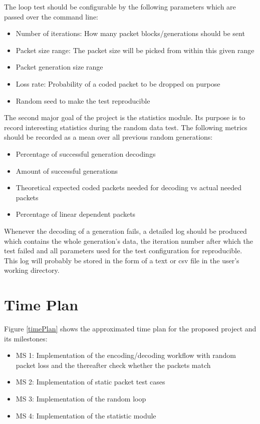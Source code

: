 \documentclass[a4paper,english,10pt]{tumarticle}
\begin{document}
The loop test should be configurable by the following parameters which are passed over the command line:
\begin{itemize}
    \setlength{\itemsep}{1pt}
	\setlength{\parskip}{0pt}
	\setlength{\parsep}{0pt}
    \item Number of iterations: How many packet blocks/generations should be sent
    \item Packet size range: The packet size will be picked from within this given range
    \item Packet generation size range
    \item Loss rate: Probability of a coded packet to be dropped on purpose
    \item Random seed to make the test reproducible
\end{itemize}

The second major goal of the project is the statistics module. Its purpose is to record interesting statistics during the random data test. The following metrics should be recorded as a mean over all previous random generations:
\begin{itemize}
    \setlength{\itemsep}{1pt}
	\setlength{\parskip}{0pt}
	\setlength{\parsep}{0pt}
    \item Percentage of successful generation decodings
    \item Amount of successful generations
    \item Theoretical expected coded packets needed for decoding vs actual needed packets
    \item Percentage of linear dependent packets
\end{itemize}
Whenever the decoding of a generation fails, a detailed log should be produced which contains the whole generation's data, the iteration number after which the test failed and all parameters used for the test configuration for reproducible. This log will probably be stored in the form of a text or csv file in the user's working directory.

\section{Time Plan}

Figure \ref{timePlan} shows the approximated time plan for the proposed project and its milestones:
\begin{itemize}
    \setlength{\itemsep}{1pt}
	\setlength{\parskip}{0pt}
	\setlength{\parsep}{0pt}
    \item MS 1: Implementation of the encoding/decoding workflow with random packet loss and the thereafter check whether the packets match
    \item MS 2: Implementation of static packet test cases
    \item MS 3: Implementation of the random loop
    \item MS 4: Implementation of the statistic module
\end{itemize}
\end{document}
